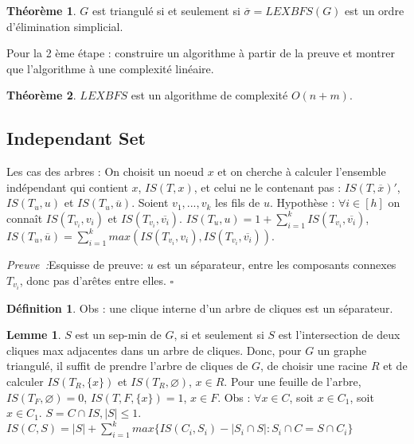 \documentclass{book}
\theoremstyle{definition}
\newtheorem{lemma}{Lemme}
\newtheorem{theorem}{Théorème}
\newtheorem{definition}{Définition}
\numberwithin{lemma}{subsection}
\numberwithin{theorem}{subsection}
\numberwithin{definition}{subsection}
\numberwithin{proposition}{subsection}
\numberwithin{corollary}{subsection}
\numberwithin{property}{subsection}
\numberwithin{example}{subsection}
\numberwithin{heuristique}{subsection}
\numberwithin{scenario}{subsection}
\newenvironment{proofi} {\noindent\emph{Preuve~:}} {\hfill $\square$\vspace{0.2cm}}
\begin{document}

\begin{theorem}
 $G$ est triangulé si et seulement si $\overline{\sigma} = LEXBFS(G)$ est un ordre d'élimination simplicial.
\end{theorem}

Pour la 2 ème étape : construire un algorithme à partir de la preuve et montrer que l'algorithme à une complexité linéaire.

\begin{theorem}
 $LEXBFS$ est un algorithme de complexité $O(n+m)$.
\end{theorem}

\subsection{Independant Set}

Les cas des arbres : 
On choisit un noeud $x$ et on cherche à calculer l'ensemble indépendant qui contient $x$, $IS(T, x)$, et celui ne le contenant pas : $IS(T, \overline{x})'$, $IS(T_u, u)$ et $IS(T_u, \overline{u})$. Soient $v_1, ..., v_k$ les fils de $u$. Hypothèse : $\forall i \in [h]$ on connaît $IS(T_{v_i}, v_i)$ et $IS(T_{v_i}, \overline{v_i})$. $IS(T_u, u) = 1 + \sum_{i=1}^k IS(T_{v_i}, \overline{v_i})$, $IS(T_u, \overline{u}) = \sum_{i=1}^k max(IS(T_{v_i}, v_i), IS(T_{v_i}, \overline{v_i}))$.

\begin{proofi}{Esquisse de preuve:}
$u$ est un séparateur, entre les composants connexes $T_{v_i}$, donc pas d'arêtes entre elles.
\end{proofi}

\begin{definition}
Obs : une clique interne d'un arbre de cliques est un séparateur.
\end{definition}


\begin{lemma}
$S$ est un sep-min de $G$, si et seulement si $S$ est l'intersection de deux cliques max adjacentes dans un arbre de cliques. Donc, pour $G$ un graphe triangulé, il suffit de prendre l'arbre de cliques de $G$, de choisir une racine $R$ et de calculer $IS(T_R, \{x\})$ et $IS(T_R, \varnothing)$, $x \in R$. Pour une feuille de l'arbre, $IS(T_F, \varnothing) = 0$, $IS(T, F, \{ x \}) = 1$, $x \in F$.  
Obs : $\forall x \in C$, soit $x \in C_1$, soit $x \in C_1$.
$S = C \cap IS, |S| \leq 1$. $IS(C, S) = |S| + \sum_{i=1}^k max \{IS(C_i, S_i) - |S_i \cap S| : S_i \cap C = S \cap C_i \}$
\end{lemma}
\end{document}
